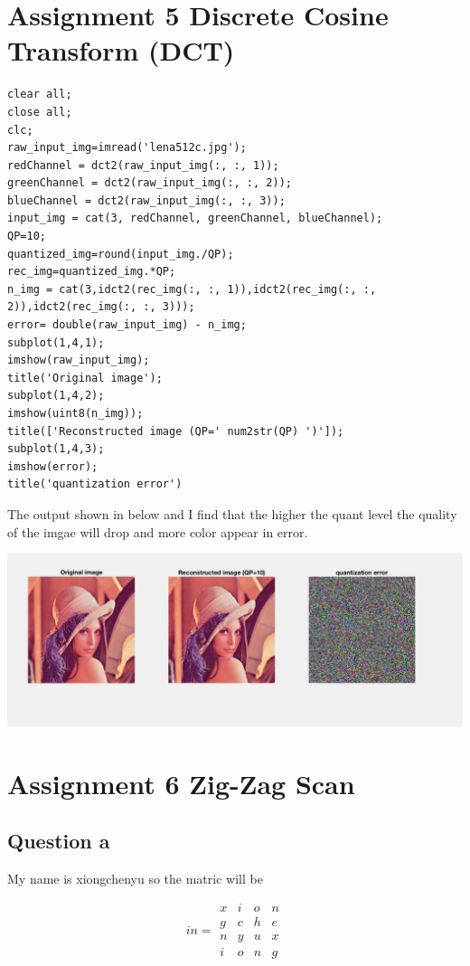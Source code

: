 \documentclass[titlepage]{article}
\begin{document}
\section{Assignment 5 Discrete Cosine Transform (DCT)}
\label{sec:org7318c39}

\begin{verbatim}
clear all;
close all;
clc;
raw_input_img=imread('lena512c.jpg');
redChannel = dct2(raw_input_img(:, :, 1));
greenChannel = dct2(raw_input_img(:, :, 2));
blueChannel = dct2(raw_input_img(:, :, 3));
input_img = cat(3, redChannel, greenChannel, blueChannel);
QP=10;
quantized_img=round(input_img./QP);
rec_img=quantized_img.*QP;
n_img = cat(3,idct2(rec_img(:, :, 1)),idct2(rec_img(:, :, 2)),idct2(rec_img(:, :, 3)));
error= double(raw_input_img) - n_img;
subplot(1,4,1);
imshow(raw_input_img);
title('Original image');
subplot(1,4,2);
imshow(uint8(n_img));
title(['Reconstructed image (QP=' num2str(QP) ')']);
subplot(1,4,3);
imshow(error);
title('quantization error')
\end{verbatim}

The output shown in below and I find that the higher the quant level the quality of the imgae will drop and more color appear in error.
\begin{center}
\includegraphics[width=.9\linewidth]{./img/quant.png}
\end{center}

\section{Assignment 6 Zig-Zag Scan}
\label{sec:org26fb97a}
\subsection{Question a}
\label{sec:orgf1daac1}
My name is xiongchenyu so the matric will be

$$in =\begin{matrix}
      x & i & o & n \\
      g & c & h & e \\
      n & y & u & x \\
      i & o & n & g
   \end{matrix}$$
\end{document}
